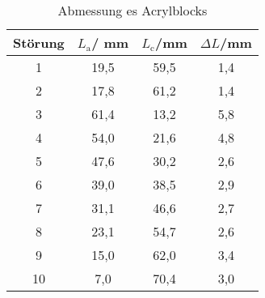 \begin{table}[h!]
  \centering
  \caption{Abmessung es Acrylblocks}
  \label{tab:störung}
  \begin{tabular}{c c c c}
    \toprule
      Störung & $L_{\text{a}}$/ mm &$L_{\text{c}}$/mm &$\Delta L$/mm\\
    \midrule
1  & 19,5 & 59,5 & 1,4\\
2  & 17,8 & 61,2 & 1,4\\
3  & 61,4 & 13,2 & 5,8\\
4  & 54,0 & 21,6 & 4,8\\
5  & 47,6 & 30,2 & 2,6\\
6  & 39,0 & 38,5 & 2,9\\
7  & 31,1 & 46,6 & 2,7\\
8  & 23,1 & 54,7 & 2,6\\
9  & 15,0 & 62,0 & 3,4\\
10 &  7,0 & 70,4 & 3,0\\
    \bottomrule
  \end{tabular}
\end{table}

